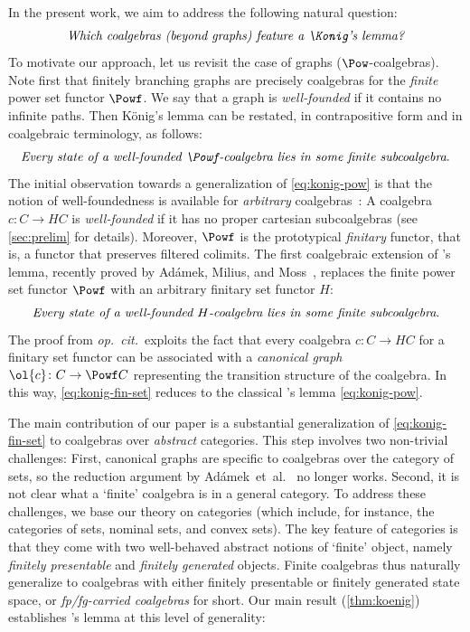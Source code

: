 In the present work, we aim to address the following natural question:
\[ \emph{Which coalgebras (beyond graphs) feature a \Konig's lemma?} \]
To motivate our approach, let us revisit the case of graphs ($\Pow$-coalgebras). Note first that finitely branching graphs are precisely coalgebras for the \emph{finite} power set functor $\Powf$. We say that a graph is \emph{well-founded} if it contains no infinite paths. Then König's lemma can be restated, in contrapositive form and in coalgebraic terminology, as follows:
\begin{equation}\label{eq:konig-pow} \emph{Every state of a well-founded $\Powf$-coalgebra lies in some finite subcoalgebra}. \end{equation}
The initial observation towards a generalization of \eqref{eq:konig-pow} is that the notion of well-foundedness is available for \emph{arbitrary} coalgebras~\cite{taylor99,amm25}: A coalgebra $c\colon C\to HC$ is \emph{well-founded} if it has no proper {cartesian} subcoalgebras (see \autoref{sec:prelim} for details). Moreover, $\Powf$ is the prototypical \emph{finitary} functor, that is, a functor that preserves filtered colimits. The first coalgebraic extension of \Konig's lemma, recently proved by Ad\'amek, Milius, and Moss~\cite[Prop.~9.2.19]{amm25}, replaces the finite power set functor $\Powf$ with an arbitrary finitary set functor $H$:
\begin{equation}\label{eq:konig-fin-set} \emph{Every state of a well-founded $H$-coalgebra lies in some finite subcoalgebra}. \end{equation}
The proof from \emph{op.~cit.}\ exploits the fact that every coalgebra $c\colon C\to HC$ for a finitary set functor can be associated with a \emph{canonical graph} $\ol{c}\colon C\to \Powf C$ representing the transition structure of the coalgebra. In this way, \eqref{eq:konig-fin-set} reduces to the classical \Konig's lemma \eqref{eq:konig-pow}. 

The main contribution of our paper is a substantial generalization of \eqref{eq:konig-fin-set} to coalgebras over \emph{abstract} categories. This step involves two non-trivial challenges: First, canonical graphs are specific to coalgebras over the category of sets, so the reduction argument by Ad\'amek~et~al.~\cite{amm25} no longer works. Second, it is not clear what a `finite' coalgebra is in a general category. To address these challenges, we base our theory on \emph{\lfp} categories (which include, for instance, the categories of sets, nominal sets, and convex sets). The key feature of \lfplong categories is that they come with two well-behaved abstract notions of `finite' object, namely \emph{finitely presentable} and \emph{finitely generated} objects. Finite coalgebras thus naturally generalize to coalgebras with either finitely presentable or finitely generated state space, or \emph{fp/fg-carried coalgebras} for short. Our main result (\autoref{thm:koenig}) establishes \Konig's lemma at this level of generality:

